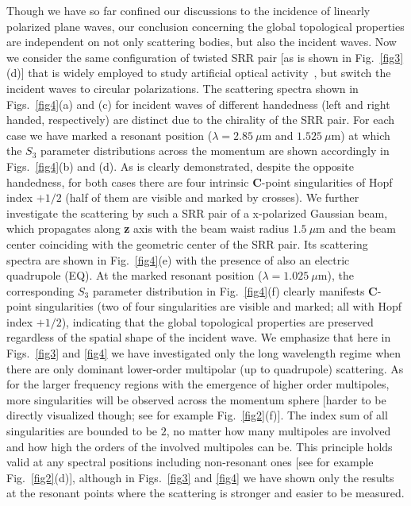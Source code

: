 \documentclass[aps,twocolumn,superscriptaddress]{revtex4-1}
\newcounter{Fig}
\begin{document}
Though we have so far confined our discussions to the incidence of linearly polarized plane waves, our conclusion concerning the global topological properties are independent on not only scattering bodies, but also the incident waves. Now we consider the same configuration of twisted SRR pair [as is shown in Fig.~\ref{fig3}(d)] that is widely employed to study artificial optical activity~\cite{Soukoulis2011_NP,HENTSCHEL_2017_Sci.Adv._Chiral}, but switch the incident waves to circular polarizations.  The scattering spectra shown in  Figs.~\ref{fig4}(a) and (c) for incident waves of different handedness (left and right handed, respectively) are distinct due to the chirality of the SRR pair. For each case we have marked a resonant position ($\lambda=2.85~\mu$m and $1.525~\mu$m) at which the $S_3$ parameter distributions across the momentum are shown accordingly in Figs.~\ref{fig4}(b) and (d). As is clearly demonstrated, despite the opposite handedness, for both cases there are four intrinsic \textbf{C}-point singularities of Hopf index $+1/2$ (half of them are visible and marked by crosses).  We further investigate the scattering by such a SRR pair of a x-polarized Gaussian beam, which propagates along \textbf{z} axis  with the beam waist radius $1.5~\mu$m and the beam center coinciding with the geometric center of the SRR pair. Its scattering spectra are shown in Fig.~\ref{fig4}(e) with the presence of also an electric quadrupole (EQ). At the marked resonant position ($\lambda=1.025~\mu$m), the corresponding $S_3$ parameter distribution in Fig.~\ref{fig4}(f) clearly manifests \textbf{C}-point singularities (two of four singularities are visible and marked; all with Hopf index $+1/2$), indicating that the global topological properties are preserved regardless of the spatial shape of the incident wave. We emphasize that here in Figs.~\ref{fig3} and \ref{fig4} we have investigated only the long wavelength regime when there are only dominant lower-order multipolar (up to quadrupole) scattering. As for the larger frequency regions with the emergence of higher order multipoles, more singularities will be observed across the momentum sphere [harder to be directly visualized though; see for example Fig.~\ref{fig2}(f)]. The index sum of all singularities are bounded to be $2$, no matter how many multipoles are involved and how high the orders of the involved multipoles can be. This principle holds valid at any spectral positions including non-resonant ones [see for example Fig.~\ref{fig2}(d)], although in Figs.~\ref{fig3} and \ref{fig4} we have shown only the results at the resonant points where the scattering is stronger and easier to be measured.
\end{document}
